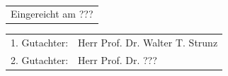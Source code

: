 \newpage
\thispagestyle{empty}
\ \vfill
\begin{tabular}{l}
Eingereicht am ???\\
\end{tabular}

\vspace{1cm}

\begin{tabular}{ll}
1. Gutachter: & Herr Prof. Dr. Walter T. Strunz\\
2. Gutachter: & Herr Prof. Dr. ???\\
\end{tabular}

\newpage
\thispagestyle{empty}
\section*{}
\section*{}
\tableofcontents
